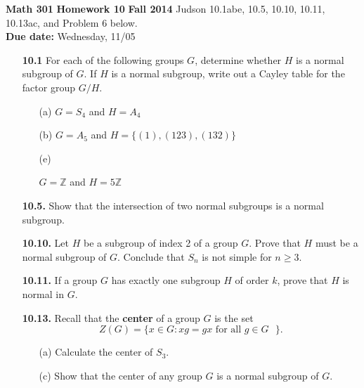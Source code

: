 \documentclass[12pt,reqno]{amsart}
\newcommand{\<}{\ensuremath{\langle}}
\renewcommand{\>}{\ensuremath{\rangle}}
\begin{document}
\thispagestyle{empty}

\noindent \textbf{Math 301} \hskip5cm {\bf Homework 10} \hfill {\bf Fall 2014}
\vskip1cm
 Judson 10.1abe, 10.5, 10.10, 10.11, 10.13ac, and
Problem 6 below.\\
{\bf Due date:} Wednesday, 11/05

\bigskip
\begin{enumerate}
\item[{\bf 10.1}] For each of the following groups $G$, determine whether $H$ is a normal
subgroup of $G$. If $H$ is a normal subgroup, write out a Cayley table
for the factor group $G/H$.
\begin{enumerate}
\item[(a)]
$G = S_4$ and $H = A_4$
 \item[(b)]
$G = A_5$ and $H = \{ (1), (123), (132) \}$
\item[(e)]

$G = {\mathbb Z}$ and $H = 5 {\mathbb Z}$
 
\end{enumerate}

\bigskip

\item[{\bf 10.5.}]
Show that the intersection of two normal subgroups is a normal
subgroup. 
 
\bigskip

\item[{\bf 10.10.}]
Let $H$ be a subgroup of index 2 of a group $G$. Prove that $H$ must
be a normal subgroup of $G$. Conclude that $S_n$ is not simple for $n \geq 3$.

\bigskip

\item[{\bf 10.11.}]
If a group $G$ has exactly one subgroup $H$ of order $k$, prove that
$H$ is normal in $G$. 

\bigskip

\item[{\bf 10.13.}]
Recall that the {\bf center} of a group $G$ is the set 
\[
Z(G) = \{ x \in G : xg = gx \text{ for all $g \in G$ } \}.
\]
\begin{enumerate}
 
 \item[(a)]
Calculate the center of $S_3$.
 
 
 \item[(c)]
Show that the center of any group $G$ is a normal subgroup of $G$. 
 
 
\end{enumerate}
 
\end{enumerate}
\vskip1cm
\end{document}
